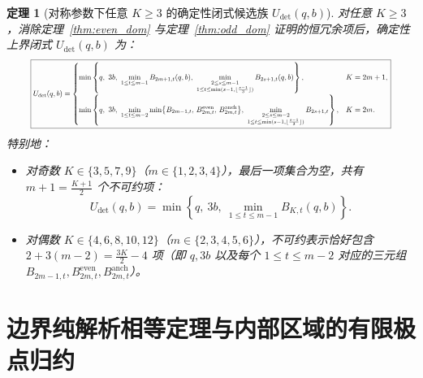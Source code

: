 \documentclass[11pt,a4paper]{article}
\newtheorem{theorem}{定理}[section]
\theoremstyle{definition}
\theoremstyle{remark}
\begin{document}
\begin{theorem}[对称参数下任意 $K \ge 3$ 的确定性闭式候选族 $U_{\mathrm{det}}(q, b)$]\label{thm:det_main}
对任意 $K \ge 3$，消除定理~\ref{thm:even_dom} 与定理~\ref{thm:odd_dom} 证明的恒冗余项后，确定性上界闭式 $U_{\mathrm{det}}(q, b)$ 为：
\begin{equation}\label{eq:U_det_general}
  \resizebox{0.92\textwidth}{!}{$\displaystyle
  \boxed{U_{\mathrm{det}}(q, b) = \begin{cases}
    \displaystyle \min\left\{ q,\ 3b,\ \min_{1 \le t \le m - 1} B_{2m+1, t}(q, b),\ \min_{\substack{2 \le s \le m - 1 \\ 1 \le t \le \min(s-1, \lfloor\frac{s-1}{3}\rfloor)}} B_{2s+1, t}(q, b) \right\}, & K = 2m + 1, \\[16pt]
    \displaystyle \min\left\{ q,\ 3b,\ \min_{1 \le t \le m - 2} \min\bigl\{ B_{2m-1, t},\, B^{\mathrm{even}}_{2m, t},\, B^{\mathrm{anch}}_{2m, t} \bigr\},\ \min_{\substack{2 \le s \le m - 2 \\ 1 \le t \le \min(s-1, \lfloor\frac{s-1}{3}\rfloor)}} B_{2s+1, t} \right\}, & K = 2m.
  \end{cases}}$}
\end{equation}
特别地：
\begin{itemize}
  \setlength{\itemsep}{2pt}\setlength{\parskip}{0pt}
  \item 对奇数 $K \in \{3, 5, 7, 9\}$（$m \in \{1, 2, 3, 4\}$），最后一项集合为空，共有 $m + 1 = \frac{K+1}{2}$ 个不可约项：
  \[
    U_{\mathrm{det}}(q, b) = \min\left\{ q,\ 3b,\ \min_{1 \le t \le m - 1} B_{K, t}(q, b) \right\}.
  \]
  \item 对偶数 $K \in \{4, 6, 8, 10, 12\}$（$m \in \{2, 3, 4, 5, 6\}$），不可约表示恰好包含 $2 + 3(m - 2) = \frac{3K}{2} - 4$ 项（即 $q, 3b$ 以及每个 $1 \le t \le m-2$ 对应的三元组 $B_{2m-1, t}, B^{\mathrm{even}}_{2m, t}, B^{\mathrm{anch}}_{2m, t}$）。
\end{itemize}
\end{theorem}

\section{边界纯解析相等定理与内部区域的有限极点归约}
\end{document}
